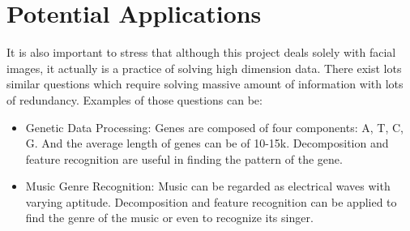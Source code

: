 \section{Potential Applications}
It is also important to stress that although this project deals solely with facial images, it actually is a practice of solving high dimension data. There exist lots similar questions which require solving massive amount of information with lots of redundancy. Examples of those questions can be:
\begin{itemize}
    \item{Genetic Data Processing: }Genes are composed of four components: A, T, C, G. And the average length of genes can be of 10-15k\cite{twine2011whole}. Decomposition and feature recognition are useful in finding the pattern of the gene.
    \item{Music Genre Recognition: }Music can be regarded as electrical waves with varying aptitude. Decomposition and feature recognition can be applied to find the genre of the music or even to recognize its singer.
\end{itemize}